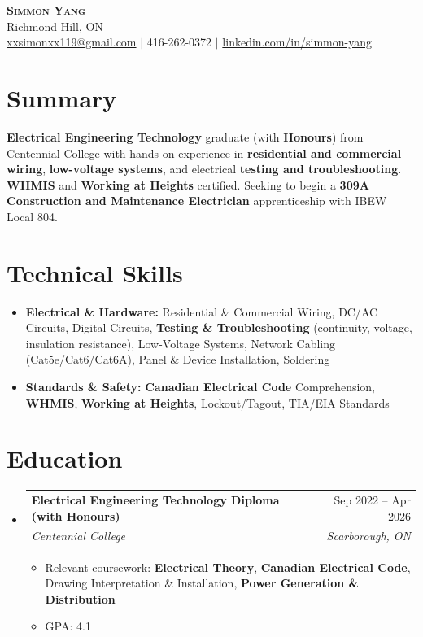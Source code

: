 \documentclass[letterpaper,11pt]{article}
\makeatletter
\newcommand{\resumeItem}[1]{\item\small{{#1 \vspace{-2pt}}}}
\newcommand{\resumeSubheading}[4]{
  \vspace{-4pt}\item
    \begin{tabular*}{0.97\textwidth}[t]{l@{\extracolsep{\fill}}r}
      \textbf{#1} & #2 \\
      \textit{\small #3} & \textit{\small #4} \\
    \end{tabular*}\vspace{-8pt}
}
\newcommand{\resumeSubHeadingListStart}{\begin{itemize}[leftmargin=0.15in, label={}]}
\newcommand{\resumeSubHeadingListEnd}{\end{itemize}}
\newcommand{\resumeItemListStart}{\begin{itemize}}
\newcommand{\resumeItemListEnd}{\end{itemize}\vspace{-5pt}}
\makeatother
\begin{document}
\begin{center}
    \textbf{\Huge \scshape Simmon Yang} \\ \vspace{1pt}
    Richmond Hill, ON \\
    \href{mailto:xxsimonxx119@gmail.com}{xxsimonxx119@gmail.com} $|$ 416-262-0372 $|$
    \href{https://www.linkedin.com/in/simmon-yang/}{linkedin.com/in/simmon-yang}
\end{center}

\section{Summary}
\textbf{Electrical Engineering Technology} graduate (with \textbf{Honours}) from Centennial College with hands-on experience in \textbf{residential and commercial wiring}, \textbf{low-voltage systems}, and electrical \textbf{testing and troubleshooting}. \textbf{WHMIS} and \textbf{Working at Heights} certified. Seeking to begin a \textbf{309A Construction and Maintenance Electrician} apprenticeship with IBEW Local 804.

\section{Technical Skills}
\begin{itemize}[leftmargin=0.15in]
  \item \textbf{Electrical \& Hardware:} Residential \& Commercial Wiring, DC/AC Circuits, Digital Circuits, \textbf{Testing \& Troubleshooting} (continuity, voltage, insulation resistance), Low-Voltage Systems, Network Cabling (Cat5e/Cat6/Cat6A), Panel \& Device Installation, Soldering
  \item \textbf{Standards \& Safety:} \textbf{Canadian Electrical Code} Comprehension, \textbf{WHMIS}, \textbf{Working at Heights}, Lockout/Tagout, TIA/EIA Standards
\end{itemize}

\section{Education}
\resumeSubHeadingListStart
\resumeSubheading
  {Electrical Engineering Technology Diploma (with Honours)}{Sep 2022 -- Apr 2026}
  {Centennial College}{Scarborough, ON}
\resumeItemListStart
  \resumeItem{Relevant coursework: \textbf{Electrical Theory}, \textbf{Canadian Electrical Code}, Drawing Interpretation \& Installation, \textbf{Power Generation \& Distribution}}
  \resumeItem{GPA: 4.1}
\resumeItemListEnd
\resumeSubHeadingListEnd
\end{document}
